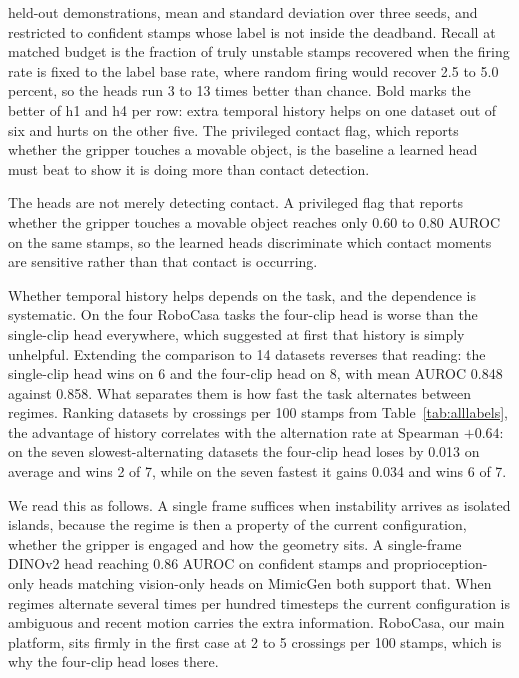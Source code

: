 \begin{table}[t]
{held-out demonstrations, mean and standard deviation over three seeds, and
restricted to confident stamps whose label is not inside the deadband. Recall
at matched budget is the fraction of truly unstable stamps recovered when the
firing rate is fixed to the label base rate, where random firing would recover
2.5 to 5.0 percent, so the heads run 3 to 13 times better than chance. Bold
marks the better of h1 and h4 per row: extra temporal history helps on one
dataset out of six and hurts on the other five. The privileged contact flag,
which reports whether the gripper touches a movable object, is the baseline a
learned head must beat to show it is doing more than contact detection.}
\label{tab:claim2}
\end{table}

The heads are not merely detecting contact. A privileged flag that reports
whether the gripper touches a movable object reaches only 0.60 to 0.80 AUROC on
the same stamps, so the learned heads discriminate which contact moments are
sensitive rather than that contact is occurring.

Whether temporal history helps depends on the task, and the dependence is
systematic. On the four RoboCasa tasks the four-clip head is worse than the
single-clip head everywhere, which suggested at first that history is simply
unhelpful. Extending the comparison to 14 datasets reverses that reading: the
single-clip head wins on 6 and the four-clip head on 8, with mean AUROC 0.848
against 0.858. What separates them is how fast the task alternates between
regimes. Ranking datasets by crossings per 100 stamps from
Table~\ref{tab:alllabels}, the advantage of history correlates with the
alternation rate at Spearman $+0.64$: on the seven slowest-alternating
datasets the four-clip head loses by 0.013 on average and wins 2 of 7, while
on the seven fastest it gains 0.034 and wins 6 of 7.

We read this as follows. A single frame suffices when instability arrives as
isolated islands, because the regime is then a property of the current
configuration, whether the gripper is engaged and how the geometry sits. A
single-frame DINOv2 head reaching 0.86 AUROC on confident stamps and
proprioception-only heads matching vision-only heads on MimicGen both support
that. When regimes alternate several times per hundred timesteps the current
configuration is ambiguous and recent motion carries the extra information.
RoboCasa, our main platform, sits firmly in the first case at 2 to 5 crossings
per 100 stamps, which is why the four-clip head loses there.

